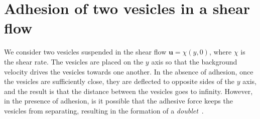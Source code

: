 \documentclass[%
preprint,
 amsmath,amssymb,
 aps,
]{revtex4-1}
\newcommand{\uu}{\mathbf{u}}
\begin{document}
%
%



\newpage %
\section{Adhesion of two vesicles in a shear flow}
\label{sec:sflow} 
We consider two vesicles suspended in the shear flow $\uu = \chi(y,0)$,
where $\chi$ is the shear rate.  The vesicles are placed on the $y$ axis
so that the background velocity drives the vesicles towards one another.
In the absence of adhesion, once the vesicles are sufficiently close,
they are deflected to opposite sides of the $y$ axis, and the result is
that the distance between the vesicles goes to infinity.  However, in
the presence of adhesion, is it possible that the adhesive force keeps
the vesicles from separating, resulting in the formation of a {\em
doublet}~\cite{}.
\end{document}
